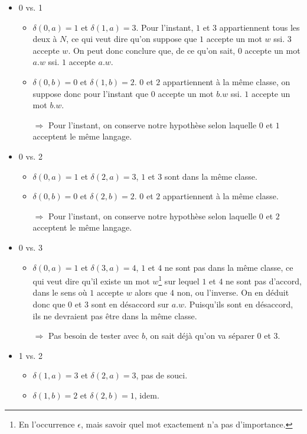 \begin{example}
\begin{itemize}
\item 0 vs. 1
\begin{itemize}
\item $\delta(0,a) = 1$ et $\delta(1,a) = 3$. Pour l'instant, $1$ et $3$ appartiennent tous les deux à $N$, ce qui veut dire qu'on suppose que $1$ accepte un mot $w$ ssi. $3$ accepte $w$. On peut donc conclure que, de ce qu'on sait, $0$ accepte un mot $a.w$ ssi. $1$ accepte $a.w$.
\item $\delta(0,b) = 0$ et $\delta(1,b) = 2$. $0$ et $2$ appartiennent à la même classe, on suppose donc pour l'instant que $0$ accepte un mot $b.w$ ssi. $1$ accepte un mot $b.w$.
\item[$\Rightarrow$] Pour l'instant, on conserve notre hypothèse selon laquelle $0$ et $1$ acceptent le même langage.
\end{itemize}
\item 0 vs. 2
\begin{itemize}
\item $\delta(0,a) = 1$ et $\delta(2,a) = 3$, $1$ et $3$ sont dans la même classe.
\item $\delta(0,b) = 0$ et $\delta(2,b) = 2$. $0$ et $2$ appartiennent à la même classe.
\item[$\Rightarrow$] Pour l'instant, on conserve notre hypothèse selon laquelle $0$ et $2$ acceptent le même langage.
\end{itemize}
\item 0 vs. 3
\begin{itemize}
\item $\delta(0,a) = 1$ et $\delta(3,a) = 4$, $1$ et $4$ ne sont pas dans la même classe, ce qui veut dire qu'il existe un mot $w$\footnote{En l'occurrence $\epsilon$, mais savoir quel mot exactement n'a pas d'importance.} sur lequel $1$ et $4$ ne sont pas d'accord, dans le sens où $1$ accepte $w$ alors que $4$ non, ou l'inverse. On en déduit donc que $0$ et $3$ sont en désaccord sur $a.w$. Puisqu'ils sont en désaccord, ils ne devraient pas être dans la même classe.
\item[$\Rightarrow$] Pas besoin de tester avec $b$, on sait déjà qu'on va séparer $0$ et $3$.
\end{itemize}
\item 1 vs. 2
\begin{itemize}
\item $\delta(1,a) = 3$ et $\delta(2,a) = 3$, pas de souci.
\item $\delta(1,b) = 2$ et $\delta(2,b) = 1$, idem.

\end{itemize}
\end{itemize}
\end{example}
